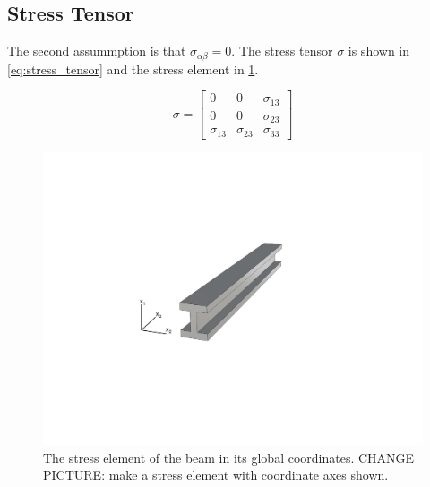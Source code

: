 \subsection{Stress Tensor}
\label{subsec:stress_tensor}
The second assummption is that $\sigma_{\alpha\beta}=0$.
The stress tensor $\sigma$ is shown in \cref{eq:stress_tensor} and the stress element in \cref{fig:stress_element}.

\begin{equation}
\sigma = \begin{bmatrix}
0 & 0 & \sigma_{13} \\
0 & 0 & \sigma_{23} \\
\sigma_{13} & \sigma_{23} & \sigma_{33}
\end{bmatrix}
\label{eq:stress_tensor}
\end{equation}

\begin{figure}%
\centering
\includegraphics[width=0.95\columnwidth,trim=4cm 7cm 6cm 6.5cm, clip]{figs/straight.pdf}
\caption{The stress element of the beam in its global coordinates. CHANGE PICTURE: make a stress element with coordinate axes shown.}
\label{fig:stress_element}
\end{figure}

